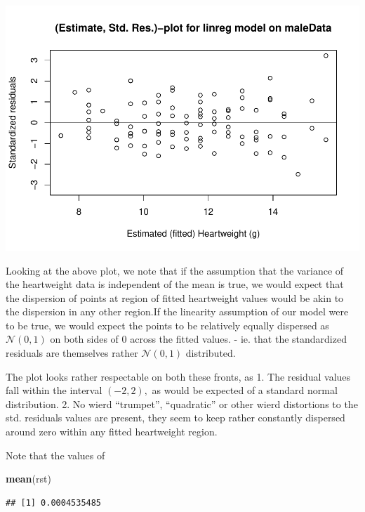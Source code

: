 \documentclass[
]{article}
\newenvironment{Shaded}{\begin{snugshade}}{\end{snugshade}}
\newcommand{\KeywordTok}[1]{\textcolor[rgb]{0.13,0.29,0.53}{\textbf{#1}}}
\newcommand{\NormalTok}[1]{#1}
\begin{document}
\begin{center}\includegraphics{matstatproblems20-21_files/figure-latex/unnamed-chunk-8-1} \end{center}

Looking at the above plot, we note that if the assumption that the
variance of the heartweight data is independent of the mean is true, we
would expect that the dispersion of points at region of fitted
heartweight values would be akin to the dispersion in any other
region.If the linearity assumption of our model were to be true, we
would expect the points to be relatively equally dispersed as
\(\mathcal{N}(0,1)\) on both sides of \(0\) across the fitted values. -
ie. that the standardized residuals are themselves rather
\(\mathcal{N}(0,1)\) distributed.

The plot looks rather respectable on both these fronts, as 1. The
residual values fall within the interval \(\left({-2,2}\right),\) as
would be expected of a standard normal distribution. 2. No wierd
``trumpet'', ``quadratic'' or other wierd distortions to the std.
residuals values are present, they seem to keep rather constantly
dispersed around zero within any fitted heartweight region.

Note that the values of

\begin{Shaded}
\begin{Highlighting}[]
\KeywordTok{mean}\NormalTok{(rst)}
\end{Highlighting}
\end{Shaded}

\begin{verbatim}
## [1] 0.0004535485
\end{verbatim}
\end{document}
